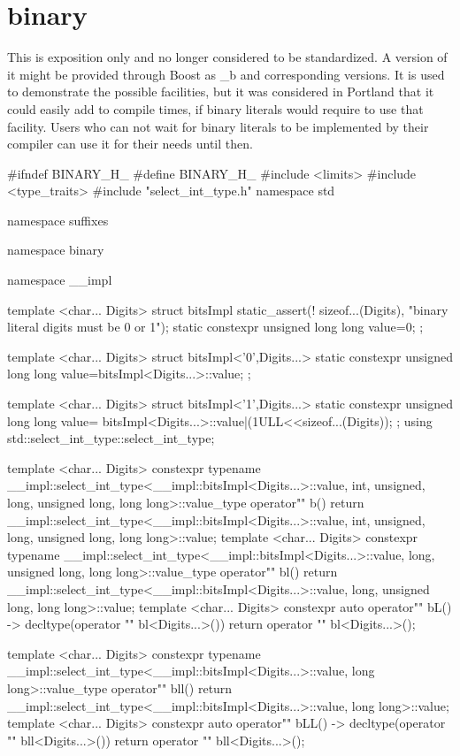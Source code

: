 \documentclass[ebook,11pt,article]{memoir}
\begin{document}
\section{binary}
This is exposition only and no longer considered to be standardized. A version of it might be provided through Boost as _b and corresponding versions. It is used to demonstrate the possible facilities, but it was considered in Portland that it could easily add to compile times, if binary literals would require to use that facility. Users who can not wait for binary literals to be implemented by their compiler can use it for their needs until then.
\begin{codeblock}
#ifndef BINARY_H_
#define BINARY_H_
#include <limits>
#include <type_traits>
#include "select_int_type.h"
namespace std{
namespace suffixes{
namespace binary{
namespace __impl{

template <char... Digits>
struct bitsImpl{
	static_assert(! sizeof...(Digits),
			"binary literal digits must be 0 or 1");
	static constexpr unsigned long long value=0;
};

template <char... Digits>
struct bitsImpl<'0',Digits...>{
	static constexpr unsigned long long value=bitsImpl<Digits...>::value;
};

template <char... Digits>
struct bitsImpl<'1',Digits...>{
	static constexpr unsigned long long value=
			bitsImpl<Digits...>::value|(1ULL<<sizeof...(Digits));
};
using std::select_int_type::select_int_type;
}

template <char... Digits>
constexpr typename
__impl::select_int_type<__impl::bitsImpl<Digits...>::value,
      int, unsigned, long, unsigned long, long long>::value_type
operator"" b(){
	return	__impl::select_int_type<__impl::bitsImpl<Digits...>::value,
			int, unsigned, long, unsigned long, long long>::value;
}
template <char... Digits>
constexpr typename
__impl::select_int_type<__impl::bitsImpl<Digits...>::value,
      long, unsigned long, long long>::value_type
operator"" bl(){
	return	__impl::select_int_type<__impl::bitsImpl<Digits...>::value,
			      long, unsigned long, long long>::value;
}
template <char... Digits>
constexpr auto
operator"" bL() -> decltype(operator "" bl<Digits...>()){
	return 	operator "" bl<Digits...>();
}

template <char... Digits>
constexpr typename
__impl::select_int_type<__impl::bitsImpl<Digits...>::value,
       long long>::value_type
operator"" bll(){
	return 	__impl::select_int_type<__impl::bitsImpl<Digits...>::value,
			      long long>::value;
}
template <char... Digits>
constexpr auto
operator"" bLL() -> decltype(operator "" bll<Digits...>()){
	return 	operator "" bll<Digits...>();
}

}}}
\end{codeblock}
\end{document}
